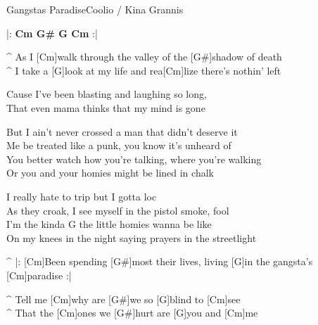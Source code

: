 \begin{song}{Gangstas Paradise}{Coolio / Kina Grannis}


\begin{guitar}
|: \textbf{Cm G# G Cm} :|\\
\end{guitar}


\begin{guitar}
^ As I [Cm]walk through the valley of the [G#]shadow of death\\
^ I take a [G]look at my life and rea[Cm]lize there's nothin' left\\
\end{guitar}
\begin{guitar}
Cause I've been blasting and laughing so long,\\
That even mama thinks that my mind is gone\\
\end{guitar}

\begin{guitar}
But I ain't never crossed a man that didn't deserve it\\
Me be treated like a punk, you know it's unheard of\\
You better watch how you're talking, where you're walking\\
Or you and your homies might be lined in chalk\\
\end{guitar}

\begin{guitar}
I really hate to trip but I gotta loc\\
As they croak, I see myself in the pistol smoke, fool\\
I'm the kinda G the little homies wanna be like\\
On my knees in the night saying prayers in the streetlight\\
\end{guitar}


\begin{guitar}
^ |: [Cm]Been spending [G#]most their lives, living [G]in the gangsta's [Cm]paradise :|\hspace{-1cm}\\
\end{guitar}

\begin{guitar}
^ Tell me [Cm]why are [G#]we so [G]blind to [Cm]see\\
^ That the [Cm]ones we [G#]hurt are [G]you and [Cm]me\\
\end{guitar}


\end{song}
